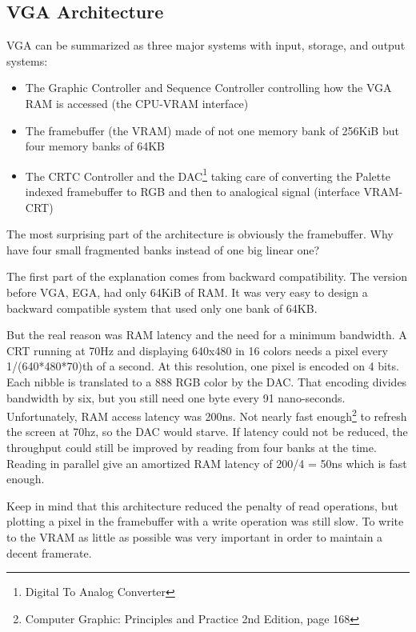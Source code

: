 \documentclass[book.tex]{subfiles}
\begin{document}
\subsection{VGA Architecture}

VGA can be summarized as three major systems with input, storage, and output systems:\\

\begin{itemize}
\item The Graphic Controller and Sequence Controller controlling how the VGA RAM is accessed (the CPU-VRAM interface)
\item The framebuffer (the VRAM) made of not one memory bank of 256KiB but four memory banks of 64KB
\item The CRTC Controller and the DAC\footnote{Digital To Analog Converter} taking care of converting the Palette indexed framebuffer to RGB and then to analogical signal (interface VRAM-CRT)
\end{itemize}

The most surprising part of the architecture is obviously the framebuffer. Why have four small fragmented banks instead of one big linear one?\\
\par
The first part of the explanation comes from backward compatibility. The version before VGA, EGA, had only 64KiB of RAM. It was very easy to design a backward compatible system that used only one bank of 64KB.\\
\par
But the real reason was RAM latency and the need for a minimum bandwidth. A CRT running at 70Hz and displaying 640x480 in 16 colors needs a pixel every 1/(640*480*70)th of a second. At this resolution, one pixel is encoded on 4 bits. Each nibble is translated to a 888 RGB color by the DAC. That encoding divides bandwidth by six, but you still need one byte every 91 nano-seconds. Unfortunately, RAM access latency was 200ns. Not nearly fast enough\footnote{Computer Graphic: Principles and Practice 2nd Edition, page 168} to refresh the screen at 70hz, so the DAC would starve. If latency could not be reduced, the throughput could still be improved by reading from four banks at the time. Reading in parallel give an amortized RAM latency of 200/4 = 50ns which is fast enough.\\
\par
Keep in mind that this architecture reduced the penalty of read operations, but plotting a pixel in the framebuffer with a write operation was still slow. To write to the VRAM as little as possible was very important in order to maintain a decent framerate. 
\end{document}
